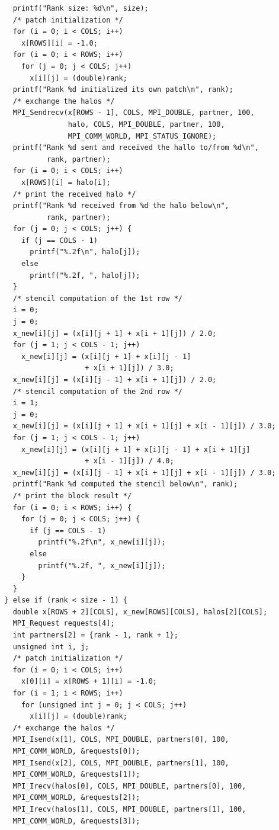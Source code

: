 \documentclass[12pt]{article}
\begin{document}
\begin{verbatim}
    printf("Rank size: %d\n", size);
    /* patch initialization */
    for (i = 0; i < COLS; i++)
      x[ROWS][i] = -1.0;
    for (i = 0; i < ROWS; i++)
      for (j = 0; j < COLS; j++)
        x[i][j] = (double)rank;
    printf("Rank %d initialized its own patch\n", rank);
    /* exchange the halos */
    MPI_Sendrecv(x[ROWS - 1], COLS, MPI_DOUBLE, partner, 100,
                 halo, COLS, MPI_DOUBLE, partner, 100,
                 MPI_COMM_WORLD, MPI_STATUS_IGNORE);
    printf("Rank %d sent and received the hallo to/from %d\n",
            rank, partner);
    for (i = 0; i < COLS; i++)
      x[ROWS][i] = halo[i];
    /* print the received halo */
    printf("Rank %d received from %d the halo below\n",
            rank, partner);
    for (j = 0; j < COLS; j++) {
      if (j == COLS - 1)
        printf("%.2f\n", halo[j]);
      else
        printf("%.2f, ", halo[j]);
    }
    /* stencil computation of the 1st row */
    i = 0;
    j = 0;
    x_new[i][j] = (x[i][j + 1] + x[i + 1][j]) / 2.0;
    for (j = 1; j < COLS - 1; j++)
      x_new[i][j] = (x[i][j + 1] + x[i][j - 1]
                     + x[i + 1][j]) / 3.0;
    x_new[i][j] = (x[i][j - 1] + x[i + 1][j]) / 2.0;
    /* stencil computation of the 2nd row */
    i = 1;
    j = 0;
    x_new[i][j] = (x[i][j + 1] + x[i + 1][j] + x[i - 1][j]) / 3.0;
    for (j = 1; j < COLS - 1; j++)
      x_new[i][j] = (x[i][j + 1] + x[i][j - 1] + x[i + 1][j]
                     + x[i - 1][j]) / 4.0;
    x_new[i][j] = (x[i][j - 1] + x[i + 1][j] + x[i - 1][j]) / 3.0;
    printf("Rank %d computed the stencil below\n", rank);
    /* print the block result */
    for (i = 0; i < ROWS; i++) {
      for (j = 0; j < COLS; j++) {
        if (j == COLS - 1)
          printf("%.2f\n", x_new[i][j]);
        else
          printf("%.2f, ", x_new[i][j]);
      }
    }
  } else if (rank < size - 1) {
    double x[ROWS + 2][COLS], x_new[ROWS][COLS], halos[2][COLS];
    MPI_Request requests[4];
    int partners[2] = {rank - 1, rank + 1};
    unsigned int i, j;
    /* patch initialization */
    for (i = 0; i < COLS; i++)
      x[0][i] = x[ROWS + 1][i] = -1.0;
    for (i = 1; i < ROWS; i++)
      for (unsigned int j = 0; j < COLS; j++)
        x[i][j] = (double)rank;
    /* exchange the halos */
    MPI_Isend(x[1], COLS, MPI_DOUBLE, partners[0], 100,
    MPI_COMM_WORLD, &requests[0]);
    MPI_Isend(x[2], COLS, MPI_DOUBLE, partners[1], 100,
    MPI_COMM_WORLD, &requests[1]);
    MPI_Irecv(halos[0], COLS, MPI_DOUBLE, partners[0], 100,
    MPI_COMM_WORLD, &requests[2]);
    MPI_Irecv(halos[1], COLS, MPI_DOUBLE, partners[1], 100,
    MPI_COMM_WORLD, &requests[3]);

\end{verbatim}
\end{document}
